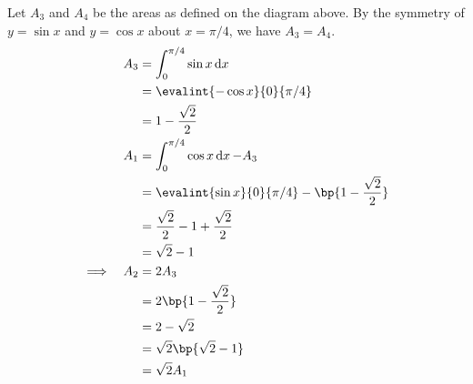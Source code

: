 \documentclass{echw}
\begin{document}
            Let $A_3$ and $A_4$ be the areas as defined on the diagram above. By the symmetry of $y = \sin x$ and $y = \cos x$ about $x = \pi/4$, we have $A_3 = A_4$.
            {\allowdisplaybreaks
            \begin{alignat*}{2}
                && A_3 &= \int_0^{\pi/4} \sin x \d x\\
                && &= \evalint{-\cos x}{0}{\pi/4}\\
                && &= 1 - \dfrac{\sqrt2}2\\
                && A_1 &= \int_0^{\pi/4} \cos x \d x - A_3\\
                && &= \evalint{\sin x}{0}{\pi/4} - \bp{1 - \dfrac{\sqrt2}2}\\
                && &= \dfrac{\sqrt2}{2} - 1 + \dfrac{\sqrt2}2\\
                && &= \sqrt2 - 1\\
                \implies&&A_2 &= 2 A_3\\
                && &= 2\bp{1 - \dfrac{\sqrt2}2}\\
                && &= 2 - \sqrt{2}\\
                && &= \sqrt{2} \bp{\sqrt2 - 1}\\
                && &= \sqrt2 A_1
            \end{alignat*}}
\end{document}
